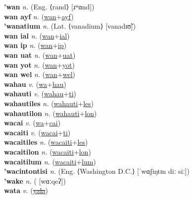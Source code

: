\textbf{'wan} \textit{n.} (Eng. ⟨rand⟩ [ɹʷɑnd])
 \label{'wan} \\
\textbf{wan ayf} \textit{n.} (\hyperref[wan]{wan}+\hyperref[ayf]{ayf})
 \label{wan ayf} \\
\textbf{'wanatium} \textit{n.} (Lat. ⟨vanadium⟩ [vanadɪʊ̃])
 \label{'wanatium} \\
\textbf{wan ial} \textit{n.} (\hyperref[wan]{wan}+\hyperref[ial]{ial})
 \label{wan ial} \\
\textbf{wan ip} \textit{n.} (\hyperref[wan]{wan}+\hyperref[ip]{ip})
 \label{wan ip} \\
\textbf{wan uat} \textit{n.} (\hyperref[wan]{wan}+\hyperref[uat]{uat})
 \label{wan uat} \\
\textbf{wan yot} \textit{n.} (\hyperref[wan]{wan}+\hyperref[yot]{yot})
 \label{wan yot} \\
\textbf{wan wel} \textit{n.} (\hyperref[wan]{wan}+\hyperref[wel]{wel})
 \label{wan wel} \\
\textbf{wahau} \textit{v.} (\hyperref[wa]{wa}+\hyperref[hau]{hau})
 \label{wahau} \\
\textbf{wahauti} \textit{v.} (\hyperref[wahau]{wahau}+\hyperref[ti]{ti})
 \label{wahauti} \\
\textbf{wahautiles} \textit{n.} (\hyperref[wahauti]{wahauti}+\hyperref[les]{les})
 \label{wahautiles} \\
\textbf{wahautilon} \textit{n.} (\hyperref[wahauti]{wahauti}+\hyperref[lon]{lon})
 \label{wahautilon} \\
\textbf{wacai} \textit{v.} (\hyperref[wa]{wa}+\hyperref[cai]{cai})
 \label{wacai} \\
\textbf{wacaiti} \textit{v.} (\hyperref[wacai]{wacai}+\hyperref[ti]{ti})
 \label{wacaiti} \\
\textbf{wacaitiles} \textit{n.} (\hyperref[wacaiti]{wacaiti}+\hyperref[les]{les})
 \label{wacaitiles} \\
\textbf{wacaitilon} \textit{n.} (\hyperref[wacaiti]{wacaiti}+\hyperref[lon]{lon})
 \label{wacaitilon} \\
\textbf{wacaitilum} \textit{n.} (\hyperref[wacaiti]{wacaiti}+\hyperref[lum]{lum})
 \label{wacaitilum} \\
\textbf{'wacintontisi} \textit{n.} (Eng. ⟨Washington D.C.⟩ [ˈwɑʃiŋtɪn diː siː])
 \label{'wacintontisi} \\
\textbf{'wake} \textit{n.} ( [wɑːqeʔ])
 \label{'wake} \\
\textbf{wata} \textit{v.} (\hyperref[yala]{\sout{yala}})
 \label{wata} \\
